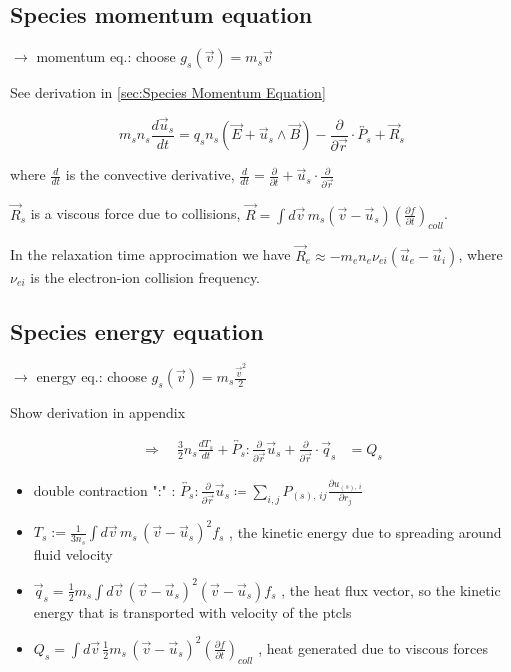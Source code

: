 \subsection{Species momentum equation}
$\to$ momentum eq.: choose $g_s(\vec{v}) = m_s \vec{v}$

See derivation in \autoref{sec:Species Momentum Equation}

\begin{equation}\label{eq: species momentum eq}
 m_s n_s \frac{d \vec{u}_s}{d t} = q_s n_s \left(\vec{E} + \vec{u}_s \wedge \vec{B}\right) - \frac{\partial}{\partial \vec{r}} \cdot \overleftrightarrow{P_s} + \vec{R}_s
\end{equation}

where $\frac{d}{dt}$ is the convective derivative, $\frac{d}{dt} = \frac{\partial}{\partial t} + \vec{u}_s \cdot \frac{\partial}{\partial \vec{r}}$

$\vec{R}_s$ is a viscous force due to collisions, $\vec{R} = \int d\vec{v} \, m_s (\vec{v} - \vec{u}_s) \left(\frac{\partial f}{\partial t}\right)_{coll} $.

In the relaxation time approcimation we have $\vec{R}_e \approx -m_e n_e \nu_{ei} (\vec{u}_e - \vec{u}_i)$,
 where $\nu_{ei}$ is the electron-ion collision frequency.

\subsection{Species energy equation}
$\to$ energy eq.: choose $g_s(\vec{v}) = m_s \frac{\vec{v}^2}{2}$

{\color{magenta} Show derivation in appendix}


\begin{align*}
\Rightarrow \quad \frac{3}{2} n_s \frac{d T_s}{d t} + \overleftrightarrow{P_s} : \frac{\partial}{\partial \vec{r}} \vec{u}_s + \frac{\partial}{\partial \vec{r}} \cdot \vec{q}_s &= Q_s
\end{align*}

\begin{itemize}
\item double contraction ":" : $\overleftrightarrow{P_s} : \frac{\partial}{\partial \vec{r}} \vec{u}_s \coloneq \sum_{i,j} P_{(s),\, ij} \frac{\partial u_{(s),\, i}}{\partial r_j}$
\item $T_s := \frac{1}{3n_s} \int d\vec{v} \, m_s \, (\vec{v} - \vec{u}_s)^2 f_s$ \quad, \quad the kinetic energy due to spreading around fluid velocity

\item $\vec{q}_s = \frac{1}{2} m_s \int d\vec{v} \, (\vec{v} - \vec{u}_s)^2 (\vec{v} - \vec{u}_s) f_s$ \quad, \quad the heat flux vector, so the kinetic energy that is transported with velocity of the ptcls

\item $Q_s = \int d\vec{v} \, \frac{1}{2} m_s \, (\vec{v} - \vec{u}_s)^2 \left(\frac{\partial f}{\partial t}\right)_{coll}$ \quad, \quad heat generated due to viscous forces
\end{itemize}

